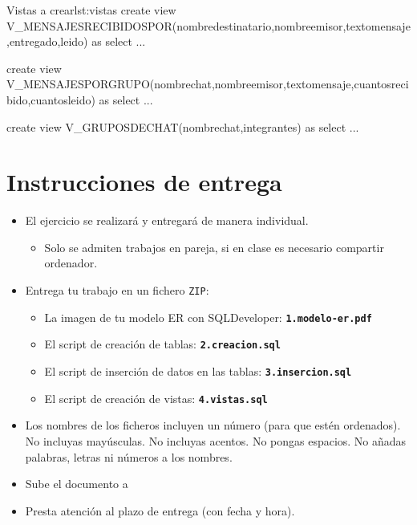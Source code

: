 \begin{homeworkProblem}
\begin{itemize}
\begin{listadosql}{Vistas a crear}{lst:vistas}
  create view V_MENSAJESRECIBIDOSPOR(nombredestinatario,nombreemisor,textomensaje,entregado,leido) as
  select ...
  
  create view V_MENSAJESPORGRUPO(nombrechat,nombreemisor,textomensaje,cuantosrecibido,cuantosleido) as
  select ...
    
  create view V_GRUPOSDECHAT(nombrechat,integrantes) as
  select ...
\end{listadosql}
    
\end{itemize}

\end{homeworkProblem}

\section{Instrucciones de entrega}
\begin{itemize}
\item El ejercicio se realizará y entregará de manera individual.
  \begin{itemize}
  \item Solo se admiten trabajos en pareja, si en clase es necesario compartir ordenador.
  \end{itemize}
\item Entrega tu trabajo en un fichero \texttt{ZIP}:
  \begin{itemize}
  \item La imagen de tu modelo ER  con SQLDeveloper: \texttt{\textbf{1.modelo-er.pdf}}
  \item El script de creación de tablas: \texttt{\textbf{2.creacion.sql}}
  \item El script de inserción de datos en las tablas: \texttt{\textbf{3.insercion.sql}}
  \item El script de creación de vistas: \texttt{\textbf{4.vistas.sql}}
  \end{itemize}
\item Los nombres de los ficheros incluyen un número (para que estén ordenados). No incluyas mayúsculas. No incluyas acentos. No pongas espacios. No añadas palabras, letras ni números a los nombres.
\item Sube el documento a 
\item Presta atención al plazo de entrega (con fecha y hora).
  
\end{itemize}





